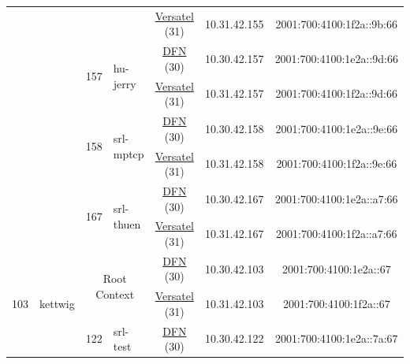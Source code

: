 \begin{small}
\begin{center}
\begin{longtable}{|c|c|c|c|c|c|c|c|}
  &  &  &  & \multicolumn{2}{|c|}{\tiny{\href{http://www.versatel.de}{Versatel} (31)}} & \tiny{10.31.42.155} & \tiny{2001:700:4100:1f2a::9b:66} \\* \cline{3-3}\cline{4-4}\cline{5-5}\cline{6-6}\cline{7-7}\cline{8-8}
  &  & \multirow{2}{*}{\tiny{157}} & \multicolumn{1}{|l|}{\multirow{2}{*}{\tiny{hu-jerry}}} & \multicolumn{2}{|c|}{\tiny{\href{https://www.dfn.de}{DFN} (30)}} & \tiny{10.30.42.157} & \tiny{2001:700:4100:1e2a::9d:66} \\* \cline{5-5}\cline{6-6}\cline{7-7}\cline{8-8}
  &  &  &  & \multicolumn{2}{|c|}{\tiny{\href{http://www.versatel.de}{Versatel} (31)}} & \tiny{10.31.42.157} & \tiny{2001:700:4100:1f2a::9d:66} \\* \cline{3-3}\cline{4-4}\cline{5-5}\cline{6-6}\cline{7-7}\cline{8-8}
  &  & \multirow{2}{*}{\tiny{158}} & \multicolumn{1}{|l|}{\multirow{2}{*}{\tiny{srl-mptcp}}} & \multicolumn{2}{|c|}{\tiny{\href{https://www.dfn.de}{DFN} (30)}} & \tiny{10.30.42.158} & \tiny{2001:700:4100:1e2a::9e:66} \\* \cline{5-5}\cline{6-6}\cline{7-7}\cline{8-8}
  &  &  &  & \multicolumn{2}{|c|}{\tiny{\href{http://www.versatel.de}{Versatel} (31)}} & \tiny{10.31.42.158} & \tiny{2001:700:4100:1f2a::9e:66} \\* \cline{3-3}\cline{4-4}\cline{5-5}\cline{6-6}\cline{7-7}\cline{8-8}
  &  & \multirow{2}{*}{\tiny{167}} & \multicolumn{1}{|l|}{\multirow{2}{*}{\tiny{srl-thuen}}} & \multicolumn{2}{|c|}{\tiny{\href{https://www.dfn.de}{DFN} (30)}} & \tiny{10.30.42.167} & \tiny{2001:700:4100:1e2a::a7:66} \\* \cline{5-5}\cline{6-6}\cline{7-7}\cline{8-8}
  &  &  &  & \multicolumn{2}{|c|}{\tiny{\href{http://www.versatel.de}{Versatel} (31)}} & \tiny{10.31.42.167} & \tiny{2001:700:4100:1f2a::a7:66} \\ \hline
 \multirow{24}{*}{\tiny{103}} & \multicolumn{1}{|l|}{\multirow{24}{*}{\tiny{kettwig}}} & \multicolumn{2}{|c|}{\multirow{2}{*}{\tiny{Root Context}}} & \multicolumn{2}{|c|}{\tiny{\href{https://www.dfn.de}{DFN} (30)}} & \tiny{10.30.42.103} & \tiny{2001:700:4100:1e2a::67} \\* \cline{5-5}\cline{6-6}\cline{7-7}\cline{8-8}
  &  & \multicolumn{2}{|c|}{} & \multicolumn{2}{|c|}{\tiny{\href{http://www.versatel.de}{Versatel} (31)}} & \tiny{10.31.42.103} & \tiny{2001:700:4100:1f2a::67} \\* \cline{3-3}\cline{4-4}\cline{5-5}\cline{6-6}\cline{7-7}\cline{8-8}
  &  & \multirow{2}{*}{\tiny{122}} & \multicolumn{1}{|l|}{\multirow{2}{*}{\tiny{srl-test}}} & \multicolumn{2}{|c|}{\tiny{\href{https://www.dfn.de}{DFN} (30)}} & \tiny{10.30.42.122} & \tiny{2001:700:4100:1e2a::7a:67} \\* \cline{5-5}\cline{6-6}\cline{7-7}\cline{8-8}

\end{longtable}
\end{center}
\end{small}
